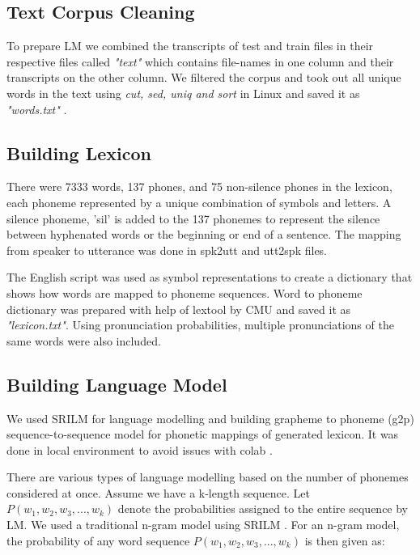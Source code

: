 \subsection{Text Corpus Cleaning}

To prepare LM we combined the transcripts of test and train files in their respective files called \textit{"text"} which contains file-names in one column and their transcripts on the other column. We filtered the corpus and took out all unique words in the text using \textit{cut, sed, uniq and sort} in Linux and saved it as \textit{"words.txt"} \cite{chodroff_corpus_2018}. 

\subsection{Building Lexicon}
There were 7333 words, 137 phones, and 75 non-silence phones in the lexicon, each phoneme represented by a unique combination of symbols and letters. A silence phoneme, 'sil' is added to the 137 phonemes to represent the silence between hyphenated words or the beginning or end of a sentence. The mapping from speaker to utterance was done in spk2utt and utt2spk files.

The English script was used as symbol representations to create a dictionary that shows how words are mapped to phoneme sequences. Word to phoneme dictionary was prepared with help of lextool by CMU \cite{cmu_cmu_nodate} and saved it as \textit{"lexicon.txt"}. Using pronunciation probabilities, multiple pronunciations of the same words were also included.  

\subsection{Building Language Model}

We used SRILM \cite{andreas_stolcke_srilm_2002} for language modelling and building grapheme to phoneme (g2p) sequence-to-sequence model for phonetic mappings of generated lexicon. It was done in local environment to avoid issues with colab \cite{naeem_subspace_2020}. 

There are various types of language modelling based on the number of phonemes considered at once. Assume we have a k-length sequence. Let $P(w_{1}, w_{2}, w_{3},..., w_{k})$ denote the probabilities assigned to the entire sequence by LM. We used a traditional n-gram model using SRILM \cite{andreas_stolcke_srilm_2002}. For an n-gram model, the probability of any word sequence $P(w_{1}, w_{2}, w_{3},..., w_{k})$ is then given as:

